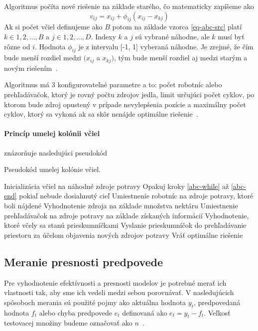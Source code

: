 \documentclass[a4paper,slovak,12pt,appendix]{article}
\begin{document}
Algoritmus počíta nové riešenie na základe starého, čo matematicky zapíšeme ako
\begin{equation}
  v_{ij} = x_{ij} + \phi_{ij} (x_{ij} - x_{kj})
  \label{eq-abc-src}
\end{equation}
Ak si počet včiel definujeme ako $B$ potom na základe vzorca \ref{eq-abc-src}
platí $k \in {1, 2, ..., B}$ a $j \in {1, 2, ..., D}$. Indexy $k$ a $j$ sú
vybrané náhodne, ale $k$ musí byť rôzne od $i$. Hodnota $\phi_{ij}$ je
z intervalu [-1, 1] vyberaná náhodne. Je zrejmé, že čím bude menší rozdiel
medzi $(x_{ij}$ a $x_{kj})$, tým bude menší rozdiel aj medzi starým a novým
riešením~\cite{Karaboga2007}.

Algoritmus má 3 konfigurovateľné parametre a to: počet robotníc alebo prehľadávačok,
ktorý je rovný počtu zdrojov jedla, limit určujúci počet cyklov, po ktorom bude
zdroj opustený v prípade nevylepšenia pozície  a maximálny počet cyklov, ktorý
sa vykoná ak sa skôr nenájde optimálne riešenie~\cite{Karaboga2007}.

\paragraph{Princíp umelej kolónii včiel} znázorňuje nasledujúci
pseudokód~\cite{Karaboga2007}
\begin{algorithm}[H]
  \caption{Pseudokód umelej kolónie včiel.}
  \begin{algorithmic}[1]
    \State Inicializácia včiel na náhodné zdroje potravy
    \State Opakuj kroky \ref{abc-while} až \ref{abc-end} pokiaľ nebude dosiahnutý cieľ \label{abc-while}
    \State Umiestnenie robotníc na zdroje potravy, ktoré boli nájdené
    \State Vyhodnotenie zdroja na základe množstva nektáru
    \State Umiestnenie prehľadávačok na zdroje potravy na základe získaných informácií
    \State Vyhodnotenie, ktoré včely sa stanú prieskumníčkami
    \State Vyslanie prieskumníčok do prehľadávanie priestoru za účelom objavenia nových zdrojov potravy \label{abc-end}
    \State Vráť optimálne riešenie
  \end{algorithmic}
\end{algorithm}


\subsection{Meranie presnosti predpovede}
Pre vyhodnotenie efektívnosti a presnosti modelov je potrebné merať ich
vlastnosti tak, aby sme ich vedeli medzi sebou porovnávať. V nasledujúcich
spôsoboch merania sú použité pojmy ako aktuálna hodnota $y_t$, predpovedaná
hodnota $f_t$ alebo chyba predpovede $e_t$ definovaná ako $e_t = y_t - f_t$.
Veľkosť testovacej množiny budeme označovať ako $n$~\cite{Agrawal2013}.
\end{document}
